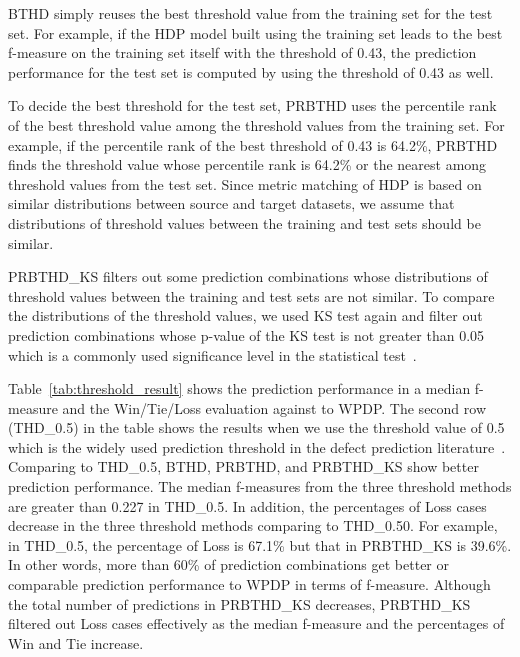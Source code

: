 BTHD simply reuses the best threshold value from the training set for the test set. For example, if the HDP model built using the training set leads to the best f-measure on the training set itself with the threshold of 0.43, the prediction performance for the test set is computed by using the threshold of 0.43 as well.

To decide the best threshold for the test set, PRBTHD uses the percentile rank of the best threshold value among the threshold values from the training set.  For example, if the percentile rank of the best threshold of 0.43 is 64.2\%, PRBTHD finds the threshold value whose percentile rank is 64.2\% or the nearest among threshold values from the test set. Since metric matching of HDP is based on similar distributions between source and target datasets, we assume that distributions of threshold values between the training and test sets should be similar.

PRBTHD\_KS filters out some prediction combinations whose distributions of threshold values between the training and test sets are not similar. To compare the distributions of the threshold values, we used KS test again and filter out prediction combinations whose p-value of the KS test is not greater than 0.05 which is a commonly used significance level in the
statistical test~\cite{Corder09}.

Table~\ref{tab:threshold_result} shows the prediction performance in a median f-measure and the Win/Tie/Loss evaluation against to WPDP. The second row (THD\_0.5) in the table shows the results when we use the threshold value of 0.5 which is the widely used prediction threshold in the defect prediction literature~\cite{Lee11,Rahman13,Herzig13,Zimmermann09}. Comparing to THD\_0.5, BTHD, PRBTHD, and PRBTHD\_KS show better prediction performance. The median f-measures from the three threshold methods are greater than 0.227 in THD\_0.5. In addition, the percentages of Loss cases decrease in the three threshold methods comparing to THD\_0.50. For example, in THD\_0.5, the percentage of Loss is 67.1\% but that in PRBTHD\_KS is 39.6\%. In other words, more than 60\% of prediction combinations get better or comparable prediction performance to WPDP in terms of f-measure. Although the total number of predictions in PRBTHD\_KS decreases, PRBTHD\_KS filtered out Loss cases effectively as the median f-measure and the percentages of Win and Tie increase.


